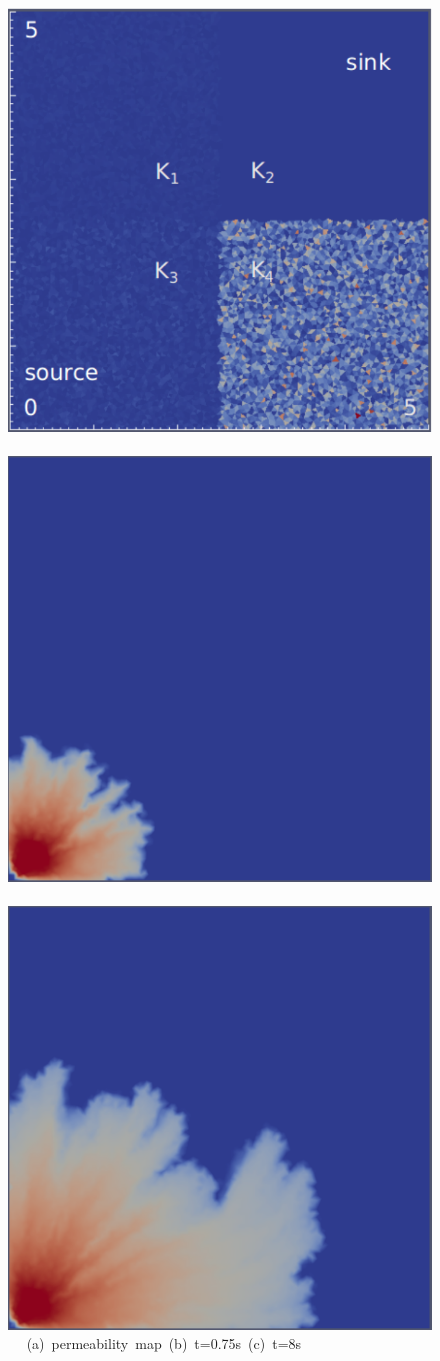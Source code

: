 \begin{landscape}
  \begin{figure}[ht]
  \vbox{\vspace{-1cm}
      \hbox{\includegraphics[width=.5\textwidth]{./Pics1/Saffman_heterogeneous/saffman_heter_fixed_1.pdf}
            \includegraphics[width=.5\textwidth]{./Pics1/Saffman_heterogeneous/saffman_heter_fixed_500.pdf} 
            \includegraphics[width=.5\textwidth]{./Pics1/Saffman_heterogeneous/saffman_heter_fixed_2000.pdf} }
      \hbox{\hspace{1.0cm} (a) permeability map \hspace{3.cm} (b) t=0.75s \hspace{4.0cm} (c) t=8s}
}
\end{figure}
\end{landscape}
